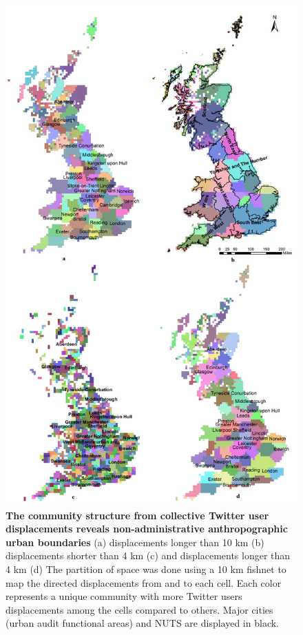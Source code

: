 \documentclass[]{tGIS2e}
\begin{document}
\begin{figure}[ht]
\begin{center}
\includegraphics[width=0.9\linewidth]{./figure/S5_community}
\caption{{\bf The community structure from collective Twitter user displacements reveals non-administrative anthropographic urban boundaries} (a) displacements longer than 10 km (b) displacements shorter than 4 km (c) and displacements longer than 4 km (d) The partition of space was done using a 10 km fishnet to map the directed displacements from and to each cell. Each color represents a unique community with more Twitter users displacements among the cells compared to others. Major cities (urban audit functional areas) and NUTS are displayed in black.}
\label{S5_Fig}
\end{center}
\end{figure}
\end{document}
